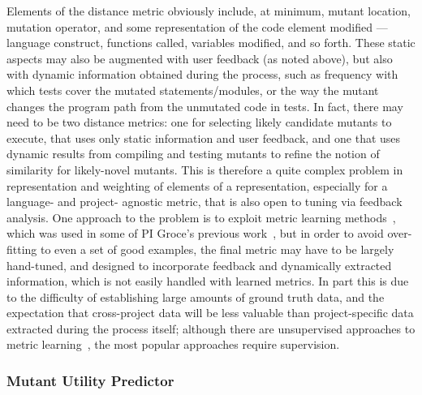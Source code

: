 Elements of the
distance metric obviously include, at minimum, mutant location, mutation operator, and
some representation of the code element modified --- language
construct, functions called, variables modified, and so forth.  These
static aspects may also be augmented with user feedback (as noted
above), but also with dynamic information obtained during the process,
such as frequency with which tests cover the mutated
statements/modules, or the way the mutant changes the
program path from the unmutated code in tests.  In fact, there may
need to be two distance metrics:  one for selecting likely candidate
mutants to execute, that uses only static information and user
feedback, and one that uses dynamic results from compiling and testing
mutants to refine the notion of similarity for likely-novel mutants.
This is therefore a quite complex problem in representation and weighting of elements of a
representation, especially for a language- and
project- agnostic metric, that is also open to tuning via feedback
analysis.  One approach to the problem is to exploit metric learning
methods~\cite{kulis2012metric}, which was used in some of PI Groce's
previous work~\cite{SoftMining}, but in order to avoid over-fitting
to even a set of good examples, the final metric may have to be largely
hand-tuned, and designed to incorporate feedback and dynamically
extracted information, which is not easily handled with learned metrics.  In part this is due to the difficulty of establishing
large amounts of ground truth data, and the expectation that
cross-project data will be less valuable than project-specific data
extracted during the process itself; although there are unsupervised
approaches to metric learning~\cite{scholkopf1998nonlinear,tipping1999probabilistic}, the most popular approaches require supervision.

\subsubsection{Mutant Utility Predictor}

